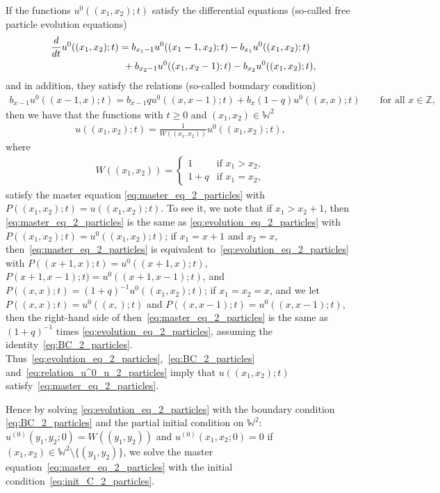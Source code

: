 \documentclass[pdftex]{sigma}
\numberwithin{equation}{section}
\newcommand{\intZ}{\mathbb{Z}}
\newcommand{\Weylchamber}{\mathbb{W}}
\begin{document}
If the functions $u^0((x_1, x_2); t)$ satisfy the dif\/ferential equations (so-called free particle evolution equations)
\begin{gather}
 \frac{d}{dt} u^0((x_1, x_2); t) = b_{x_1 - 1} u^0((x_1 - 1, x_2); t) - b_{x_1} u^0((x_1, x_2); t) \nonumber\\
 \hphantom{\frac{d}{dt} u^0((x_1, x_2); t) =}{} + b_{x_2 - 1} u^0((x_1, x_2 - 1); t) - b_{x_2} u^0((x_1, x_2); t),\label{eq:evolution_eq_2_particles}
\end{gather}
and in addition, they satisfy the relations (so-called boundary condition)
\begin{gather} \label{eq:BC_2_particles}
 b_{x - 1} u^0((x - 1, x); t) = b_{x - 1} q u^0((x, x - 1); t) + b_x (1 - q) u^0((x, x); t) \qquad \text{for all $x \in \intZ$},\!\!\!
\end{gather}
then we have that the functions with $t \geq 0$ and $(x_1, x_2) \in \Weylchamber^2$
\begin{gather} \label{eq:relation_u^0_u_2_particles}
 u((x_1, x_2); t) = \frac{1}{W((x_1, x_2))} u^0((x_1, x_2); t),
 \end{gather}
where
\begin{gather*}
W((x_1, x_2)) =
 \begin{cases}
 1 & \text{if $x_1 > x_2$}, \\
 1 + q & \text{if $x_1 = x_2$},
 \end{cases}
\end{gather*}
satisfy the master equation \eqref{eq:master_eq_2_particles} with $P((x_1, x_2); t) = u((x_1, x_2); t)$. To see it, we note that if $x_1 > x_2 + 1$, then \eqref{eq:master_eq_2_particles} is the same as \eqref{eq:evolution_eq_2_particles} with $P((x_1, x_2); t) = u^0((x_1, x_2); t)$; if $x_1 = x + 1$ and $x_2 = x$, then~\eqref{eq:master_eq_2_particles} is equivalent to~\eqref{eq:evolution_eq_2_particles} with $P((x + 1, x); t) = u^0((x + 1, x); t)$, $P(x + 1, x - 1); t) = u^0((x + 1, x - 1); t)$, and $P((x, x); t) = (1 + q)^{-1} u^0((x_1, x_2); t)$; if $x_1 = x_2 = x$, and we let $P((x, x); t) = u^0((x, ); t)$ and $P((x, x - 1); t) = u^0((x, x - 1); t)$, then the right-hand side of then~\eqref{eq:master_eq_2_particles} is the same as $(1 + q)^{-1}$ times \eqref{eq:evolution_eq_2_particles}, assuming the identity~\eqref{eq:BC_2_particles}. Thus~\eqref{eq:evolution_eq_2_particles},~\eqref{eq:BC_2_particles} and~\eqref{eq:relation_u^0_u_2_particles} imply that $u((x_1, x_2); t)$ satisfy~\eqref{eq:master_eq_2_particles}.

Hence by solving \eqref{eq:evolution_eq_2_particles} with the boundary condition \eqref{eq:BC_2_particles} and the partial initial condition on $\Weylchamber^2$: $u^{(0)}(y_1, y_2; 0) = W((y_1, y_2))$ and $u^{(0)}(x_1, x_2; 0) = 0$ if $(x_1, x_2) \in \Weylchamber^2 {\setminus} \{ (y_1, y_2) \}$, we solve the master equation~\eqref{eq:master_eq_2_particles} with the initial condition~\eqref{eq:init_C_2_particles}.
\end{document}
